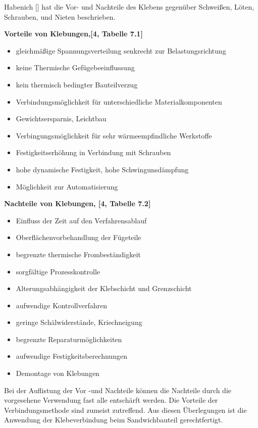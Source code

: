 \documentclass[12 pt,a4 paper ]{scrreprt}
\begin{document}
Habenich [] hat die Vor- und Nachteile des Klebens gegenüber Schweißen, Löten, Schrauben, und Nieten beschrieben. 
\newline{}

\textbf{Vorteile von Klebungen,[4, Tabelle 7.1]}
\begin{itemize}
	\item gleichmäßige Spannungsverteilung senkrecht zur Belastungsrichtung 
	\item keine Thermische Gefügebeeinflussung
	\item kein thermisch bedingter Bauteilverzug
	\item Verbindungsmöglichkeit für unterschiedliche Materialkomponenten
	\item Gewichtsersparnis, Leichtbau
	\item Verbingungsmöglichkeit für sehr wärmeempfindliche Werkstoffe
	\item Festigkeitserhöhung in Verbindung mit Schrauben
	\item hohe dynamische Festigkeit, hohe Schwingunsdämpfung
	\item Möglichkeit zur Automatisierung
\end{itemize}


\textbf{Nachteile von Klebungen, [4, Tabelle 7.2]}

\begin{itemize}
	\item Einfluss der Zeit auf den Verfahrensablauf
	\item Oberflächenvorbehandlung der Fügeteile
	\item begrenzte thermische Frombeständigkeit
	\item sorgfältige Prozesskontrolle
	\item Alterungsabhängigkeit der Klebschicht und Grenzschicht
	\item aufwendige Kontrollverfahren
	\item geringe Schälwiderstände, Kriechneigung
	\item begrenzte Reparaturmöglichkeiten
	\item aufwendige Festigkeitsberechnungen
	\item Demontage von Klebungen
	\end{itemize}

Bei der Auflistung der Vor -und Nachteile können die Nachteile durch die vorgesehene Verwendung fast alle entschärft werden. Die Vorteile der Verbindungsmethode sind zumeist zutreffend. Aus diesen Überlegungen ist die Anwendung der Klebeverbindung beim Sandwichbauteil gerechtfertigt.
\end{document}
